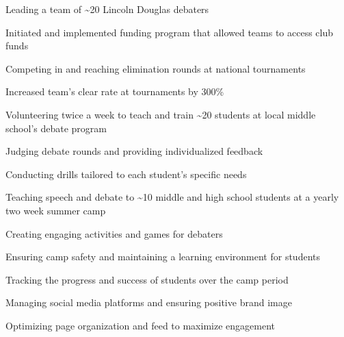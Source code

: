 \documentclass[letterpaper]{resume-shreeram}
\begin{document}
\begin{compactitem}
    \item Leading a team of \textasciitilde{}20 Lincoln Douglas debaters

    \item Initiated and implemented funding program that allowed teams
      to access club funds

    \item Competing in and reaching elimination rounds at national tournaments

    \item Increased team's clear rate at tournaments by 300\%
\end{compactitem}

\begin{compactitem}
    \item Volunteering twice a week to teach and train
      \textasciitilde{}20 students at local middle school's debate
      program

    \item Judging debate rounds and providing individualized feedback

    \item Conducting drills tailored to each student's specific needs
\end{compactitem}

\begin{compactitem}
    \item Teaching speech and debate to \textasciitilde{}10 middle and
      high school students at a yearly two week summer camp

    \item Creating engaging activities and games for debaters

    \item Ensuring camp safety and maintaining a learning environment
      for students

    \item Tracking the progress and success of students over the camp
      period
\end{compactitem}

\begin{compactitem}
    \item Managing social media platforms and ensuring positive brand
      image

    \item Optimizing page organization and feed to maximize engagement
\end{compactitem}
\end{document}
